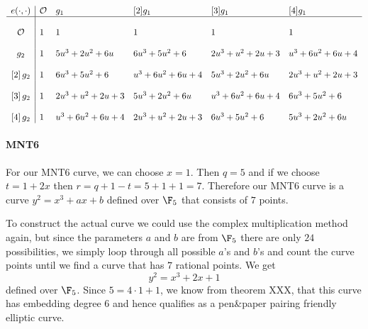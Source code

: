     
$$
\begin{array}{c|lllll}
e(\cdot,\cdot)    & \mathcal{O} & g_1            & [2]g_1         & [3]g_1         & [4]g_1\\
\hline
\\
      \mathcal{O} & 1           & 1              & 1              & 1              & 1\\
\\
              g_2 & 1           & 5u^3+2u^2+6u   & 6u^3+5u^2+6    & 2u^3+u^2+2u+3  & u^3+6u^2+6u+4\\
\\
\left[2\right]g_2 & 1           & 6u^3+5u^2+6    & u^3+6u^2+6u+4  & 5u^3+2u^2+6u   & 2u^3+u^2+2u+3\\
\\
\left[3\right]g_2 & 1           & 2u^3+u^2+2u+3  & 5u^3+2u^2+6u   & u^3+6u^2+6u+4  & 6u^3+5u^2+6\\
\\
\left[4\right]g_2 & 1           & u^3+6u^2+6u+4  & 2u^3+u^2+2u+3  & 6u^3+5u^2+6    & 5u^3+2u^2+6u\\
\end{array}
$$
\endgroup

\paragraph{MNT6}
For our MNT6 curve, we can choose $x=1$. Then $q=5$ and if we choose $t= 1 + 2x $ then $r= q + 1 - t = 5 + 1 + 1 = 7$. Therefore our MNT6 curve is a curve $y^2=x^3+ax+b$ defined over $\F_5$ that consists of $7$ points. 

To construct the actual curve we could use the complex multiplication method again, but since the parameters $a$ and $b$ are from $\F_5$ there are only $24$ possibilities, we simply loop through all possible $a$'s and $b$'s and count the curve points until we find a curve that has $7$ rational points. We get
$$
y^2 = x^3 + 2x + 1
$$
defined over $\F_5$. Since $5= 4\cdot 1 + 1$, we know from theorem XXX, that this curve has embedding degree $6$ and hence qualifies as a pen\&{}paper pairing friendly elliptic curve. 


